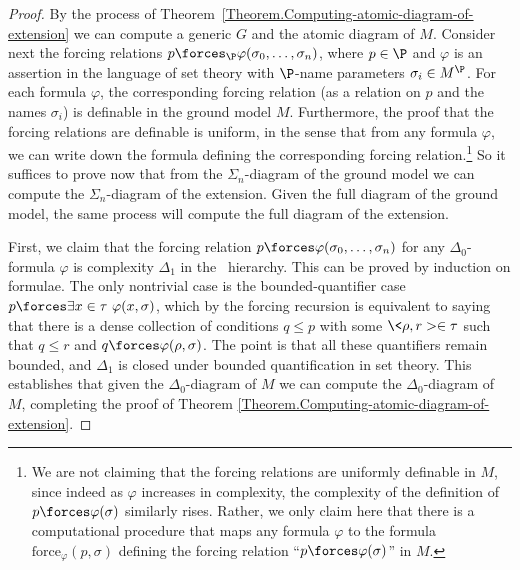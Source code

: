 \documentclass{amsart}
\begin{document}
 \begin{proof}
 By the process of Theorem~\ref{Theorem.Computing-atomic-diagram-of-extension} we can compute a generic $G$ and the atomic diagram of $M$. Consider next the forcing relations $p\forces_\P\varphi(\sigma_0,\ldots,\sigma_n)$, where $p\in\P$ and $\varphi$ is an assertion in the language of set theory with $\P$-name parameters $\sigma_i\in M^\P$. For each formula $\varphi$, the corresponding forcing relation (as a relation on $p$ and the names $\sigma_i$) is definable in the ground model $M$. Furthermore, the proof that the forcing relations are definable is uniform, in the sense that from any formula $\varphi$, we can write down the formula defining the corresponding forcing relation.\footnote{We are not claiming that the forcing relations are uniformly definable in $M$, since indeed as $\varphi$ increases in complexity, the complexity of the definition of $p\forces\varphi(\sigma)$ similarly rises. Rather, we only claim here that there is a computational procedure that maps any formula $\varphi$ to the formula $\text{force}_\varphi(p,\sigma)$ defining the forcing relation ``$p\forces\varphi(\sigma)$'' in $M$.}
 So it suffices to prove now that from the $\Sigma_n$-diagram of the ground model we can compute the $\Sigma_n$-diagram of the extension. Given the full diagram of the ground model, the same process will compute the full diagram of the extension.
 
 First, we claim that the forcing relation $p \forces \varphi(\sigma_0, \ldots, \sigma_n)$ for any $\Delta_0$-formula $\varphi$ is complexity $\Delta_1$ in the \Levy\ hierarchy. This can be proved by induction on formulae. The only nontrivial case is the bounded-quantifier case $p\forces\exists x\in\tau\ \varphi(x,\sigma)$, which by the forcing recursion is equivalent to saying that there is a dense collection of conditions $q\leq p$ with some $\<\rho,r>\in\tau$ such that $q\leq r$ and $q\forces\varphi(\rho,\sigma)$. The point is that all these quantifiers remain bounded, and $\Delta_1$ is closed under bounded quantification in set theory. This establishes that given the $\Delta_0$-diagram of $M$ we can compute the $\Delta_0$-diagram of $M$, completing the proof of Theorem \ref{Theorem.Computing-atomic-diagram-of-extension}.
 

\end{proof}
\end{document}
